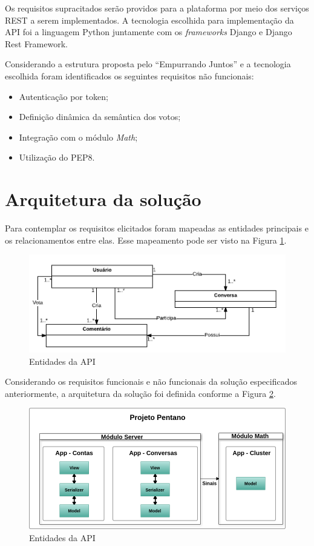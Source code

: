 Os requisitos supracitados serão providos para a plataforma por meio dos serviços REST a serem implementados.
A tecnologia escolhida para implementação da API foi a linguagem Python juntamente com os \textit{frameworks} Django e Django Rest Framework.

Considerando a estrutura proposta pelo ``Empurrando Juntos'' e a tecnologia escolhida foram identificados os seguintes requisitos não funcionais:

\begin{itemize}
 \item Autenticação por token;
 \item Definição dinâmica da semântica dos votos;
 \item Integração com o módulo \textit{Math};
 \item Utilização do PEP8.
\end{itemize}

\section{Arquitetura da solução}

Para contemplar os requisitos elicitados foram mapeadas as entidades principais e os relacionamentos entre elas. 
Esse mapeamento pode ser visto na Figura \ref{fig:entidades}.

\begin{figure}[h!]
\centering
\includegraphics[scale=0.6]{figuras/entidades.png}
\caption{Entidades da API}
\label{fig:entidades}
\end{figure}

Considerando os requisitos funcionais e não funcionais da solução especificados anteriormente, a arquitetura da solução foi definida 
conforme a Figura \ref{fig:arquitetura_api}.

\begin{figure}[h!]
\centering
\includegraphics[scale=0.5]{figuras/arquitetura_api.png}
\caption{Entidades da API}
\label{fig:arquitetura_api}
\end{figure}

